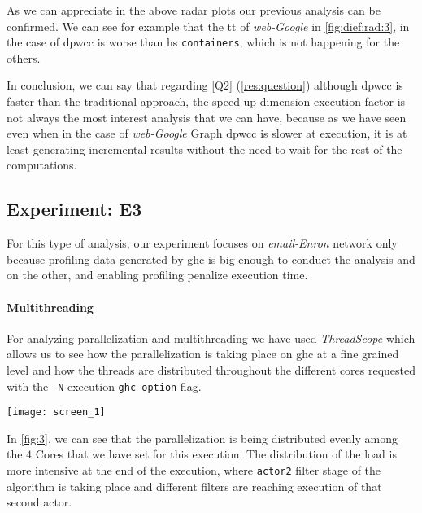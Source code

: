 As we can appreciate in the above radar plots our previous analysis can be confirmed. We can see for example that the \acrlong{tt} of \emph{web-Google} in \autoref{fig:dief:rad:3}, in the case of \acrshort{dpwcc} is worse than \acrshort{hs} \texttt{containers}, which is not happening for the others.

In conclusion, we can say that regarding [Q2] (\autoref{res:question}) although \acrshort{dpwcc} is faster than the traditional approach, the speed-up dimension execution factor is not always the most interest analysis that we can have, because as we have seen even when in the case of \emph{web-Google} Graph \acrshort{dpwcc} is slower at execution, it is at least generating incremental results without the need to wait for the rest of the computations.

\subsection{Experiment: E3}
For this type of analysis, our experiment focuses on \emph{email-Enron} network \cite{netenron} only because profiling data generated by \acrshort{ghc} is big enough to conduct the analysis and on the other, and enabling profiling penalize execution time.

\paragraph{Multithreading} For analyzing parallelization and multithreading we have used \textit{ThreadScope} \cite{threadscope} which allows us to see how the parallelization is taking place on \acrshort{ghc} at a fine grained level and how the threads are distributed throughout the different cores requested with the \texttt{-N} execution \texttt{ghc-option} flag.

\begin{minipage}[t!]{\linewidth}

  \texttt{[image: screen\_1]}
  \captionsetup{type=figure}
  \label{fig:3}
\end{minipage}

In \autoref{fig:3}, we can see that the parallelization is being distributed evenly among the $4$ Cores that we have set for this execution.
The distribution of the load is more intensive at the end of the execution, where \texttt{actor2} filter stage 
of the algorithm is taking place and different filters are reaching execution of that second actor.

